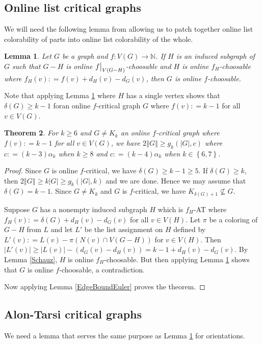 \documentclass[12pt]{article}
\theoremstyle{plain}
\newtheorem{thm}{Theorem}[section]
\newtheorem{lem}[thm]{Lemma}
\theoremstyle{definition}
\theoremstyle{remark}
\newcommand{\IN}{\mathbb{N}}
\newcommand{\set}[1]{\left\{ #1 \right\}}
\newcommand{\card}[1]{\left|#1\right|}
\newcommand{\size}[1]{\left\Vert#1\right\Vert}
\newcommand{\func}[3]{#1\colon #2 \rightarrow #3}
\newcommand{\DefinedAs}{\mathrel{\mathop:}=}
\newcommand\restr[2]{{%
  \left.\kern-\nulldelimiterspace %
  #1 %
  \vphantom{\big|} %
  \right|_{#2} %
  }}
\begin{document}
\subsection{Online list critical graphs}
We will need the following lemma from \cite{schauz2009mr} allowing us to patch together online list colorability of parts into online list colorability of the whole.

\begin{lem}\label{CutLemma}
Let $G$ be a graph and $\func{f}{V(G)}{\IN}$.  If $H$ is an induced subgraph of $G$ such that $G-H$ is online $\restr{f}{V(G-H)}$-choosable and $H$ is online $f_H$-choosable where $f_H(v) \DefinedAs f(v) + d_H(v) - d_G(v)$, then $G$ is online $f$-choosable.
\end{lem}

Note that applying Lemma \ref{CutLemma} where $H$ has a single vertex shows that $\delta(G) \geq k - 1$ foran online $f$-critical graph $G$ where $f(v) \DefinedAs k-1$ for all $v \in V(G)$.

\begin{thm}\label{EdgeBoundOnline}
For $k \geq 6$ and $G \neq K_k$ an online $f$-critical graph where $f(v) \DefinedAs k-1$ for all $v \in V(G)$, we have  $2\size{G} \geq g_k(\card{G}, c)$ where $c \DefinedAs (k-3)\alpha_k$ when $k \geq 8$ and $c \DefinedAs (k-4)\alpha_k$ when $k \in \set{6,7}$.
\end{thm}
\begin{proof}
Since $G$ is online $f$-critical, we have $\delta(G) \geq k - 1 \geq 5$.  If $\delta(G) \geq k$, then $2\size{G} \geq k\card{G} \geq g_k(\card{G}, k)$ and we are done.  Hence we may assume that $\delta(G) = k-1$. Since $G \neq K_k$ and $G$ is $f$-critical, we have $K_{\delta(G) + 1} \not \subseteq G$.  

Suppose $G$ has a nonempty induced subgraph $H$ which is $f_H$-AT where $f_H(v) \DefinedAs \delta(G) + d_H(v) - d_G(v)$ for all $v \in V(H)$.  Let $\pi$ be a coloring of $G-H$ from $L$ and let $L'$ be the list assignment on $H$ defined by $L'(v) \DefinedAs L(v) - \pi(N(v) \cap V(G-H))$ for $v \in V(H)$.  Then $\card{L'(v)} \geq \card{L(v)} - (d_G(v) - d_H(v)) = k - 1 + d_H(v) - d_G(v)$.  By Lemma \ref{Schauz}, $H$ is online $f_H$-choosable.  But then applying Lemma \ref{CutLemma} shows that $G$ is online $f$-choosable, a contradiction.

Now applying Lemma \ref{EdgeBoundEuler} proves the theorem.
\end{proof}
\subsection{Alon-Tarsi critical graphs}
We need a lemma that serves the same purpose as Lemma \ref{CutLemma} for orientations.
\end{document}

